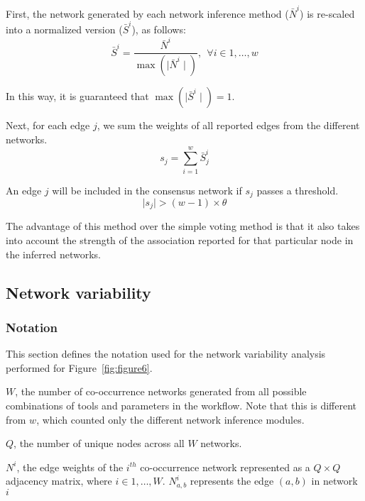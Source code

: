 \documentclass[letterpaper,12pt]{article}
\begin{document}
  First, the network generated by each network inference method ($\bar{N}^i$) is re-scaled into a normalized version ($\bar{S}^i$), as follows:
  \begin{equation}
    \bar{S}^{i} = \frac{\bar{N}^{i}}{\max(\mid \bar{N}^{i} \mid)},~~\forall i \in {1, \dots, w}
    \label{eqn:scaled-sum-rescaling}
  \end{equation}

    In this way, it is guaranteed that $\max(\mid \bar{S}^i \mid) = 1$.


  Next, for each edge $j$, we sum the weights of all reported edges from the different networks.
  \begin{equation}
    s_j = \sum_{i=1}^{w} \bar{S}^i_j
    \label{eqn:scaled-sum}
  \end{equation}


  An edge $j$ will be included in the consensus network if $s_j$ passes a threshold.
  \begin{equation}
    \mid s_j \mid > (w - 1) \times \theta
    \label{eq:scaled-sum2}
  \end{equation}

  The advantage of this method over the simple voting method is that it also takes into account the strength of the association reported for that particular node in the inferred networks.

  \subsection*{Network variability}

  \subsubsection*{Notation}
  \vspace{-5mm}
  This section defines the notation used for the network variability analysis performed for Figure~\ref{fig:figure6}.

  $W$, the number of co-occurrence networks generated from all possible combinations of tools and parameters in the workflow.
  Note that this is different from $w$, which counted only the different network inference modules.

  $Q$, the number of unique nodes across all $W$ networks.

  $N^i$, the edge weights of the $i^{th}$ co-occurrence network represented as a $Q \times Q$ adjacency matrix, where $i \in {1, \dots, W}$.
  $N^i_{a,b}$ represents the edge $(a,b)$ in network $i$
\end{document}
